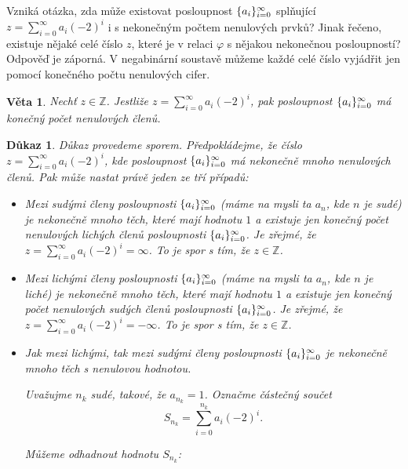 \documentclass[12pt]{book}
\newtheorem{veta}{Věta}
\newtheorem*{dukaz}{Důkaz}
\begin{document}
 Vzniká otázka, zda může existovat posloupnost $\{a_i\}_{i=0}^{\infty}$ splňující $z=\sum_{i=0}^{\infty}a_i(-2)^i$ i s nekonečným počtem nenulových prvků? Jinak řečeno, existuje nějaké celé číslo $z$, které je v relaci $\varphi$ s nějakou nekonečnou posloupností? Odpověď je záporná. V negabinární soustavě můžeme každé celé číslo vyjádřit jen pomocí konečného počtu nenulových cifer.

\begin{veta}\label{NBv2.5}
Nechť $z \in \mathbb{Z}$. Jestliže $z=\sum_{i=0}^{\infty}a_i(-2)^i$, pak posloupnost $\{a_i\}_{i=0}^{\infty}$ má konečný počet nenulových členů. 
\end{veta}


\begin{dukaz}
Důkaz provedeme sporem. Předpokládejme, že číslo $z=\sum_{i=0}^{\infty}a_i(-2)^i$, kde posloupnost $\{a_i\}_{i=0}^{\infty}$ má nekonečně mnoho nenulových členů. Pak může nastat právě jeden ze tří případů:
	\begin{itemize}
		\item[$a)$]
		      Mezi sudými členy posloupnosti $\{a_i\}_{i=0}^{\infty}$  (máme na mysli ta $a_n$, kde $n$ je sudé) je nekonečně mnoho
              těch, které mají hodnotu $1$ a existuje jen konečný počet nenulových lichých členů posloupnosti $\{a_i\}_{i=0}^{\infty}$.
		      Je zřejmé, že $z = \sum_{i=0}^{\infty}a_i(-2)^i = \infty$. To je spor s tím, že $z \in \mathbb{Z}$.

		\item[$b)$] Mezi lichými členy posloupnosti $\{a_i\}_{i=0}^{\infty}$  (máme na mysli ta $a_n$, kde $n$ je liché) je nekonečně mnoho
              těch, které mají hodnotu $1$ a existuje jen konečný počet nenulových sudých členů posloupnosti $\{a_i\}_{i=0}^{\infty}$.
		      Je zřejmé, že $z = \sum_{i=0}^{\infty}a_i(-2)^i = -\infty$. To je spor s tím, že  $z \in \mathbb{Z}$.


		\item[$c)$] Jak mezi lichými, tak mezi sudými členy posloupnosti $\{a_i\}_{i=0}^{\infty}$ je nekonečně mnoho těch s nenulovou
                    hodnotou.

                    Uvažujme $n_k$ sudé, takové, že $a_{n_k} = 1$.  Označme částečný součet
                    $$S_{n_k} = \sum_{i=0}^{n_k}a_i(-2)^i.$$

                    Můžeme odhadnout hodnotu $S_{n_k}$:


\end{itemize}
\end{dukaz}
\end{document}
